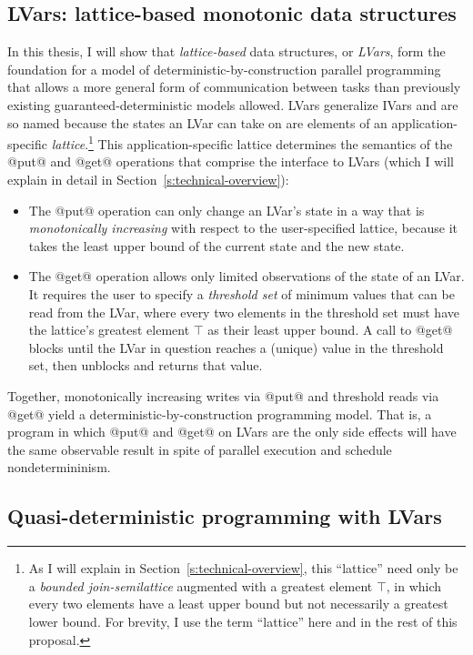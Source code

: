 \documentclass{article}
\begin{document}
\subsection{LVars: lattice-based monotonic data structures}

In this thesis, I will show that \emph{lattice-based} data structures,
or \emph{LVars}, form the foundation for a model of
deterministic-by-construction parallel programming that allows a more
general form of communication between tasks than previously existing
guaranteed-deterministic models allowed.  LVars generalize IVars and
are so named because the states an LVar can take on are elements of an
application-specific \emph{lattice}.\footnote{As I will explain in
  Section~\ref{s:technical-overview}, this ``lattice'' need only be a
  {\em bounded join-semilattice} augmented with a greatest element
  $\top$, in which every two elements have a least upper bound but not
  necessarily a greatest lower bound.  For brevity, I use the term
  ``lattice'' here and in the rest of this proposal.}  This
application-specific lattice determines the semantics of the @put@ and
@get@ operations that comprise the interface to LVars (which I will
explain in detail in Section~\ref{s:technical-overview}):
\begin{itemize}
\item The @put@ operation can only change an LVar's state in a way
  that is {\em monotonically increasing} with respect to the
  user-specified lattice, because it takes the least upper bound of
  the current state and the new state.
\item The @get@ operation allows only limited observations of the
  state of an LVar.  It requires the user to specify a \emph{threshold
    set} of minimum values that can be read from the LVar, where every
  two elements in the threshold set must have the lattice's greatest
  element $\top$ as their least upper bound.  A call to @get@ blocks
  until the LVar in question reaches a (unique) value in the threshold
  set, then unblocks and returns that value.
\end{itemize}
Together, monotonically increasing writes via @put@ and threshold
reads via @get@ yield a deterministic-by-construction programming
model.  That is, a program in which @put@ and @get@ on LVars are the
only side effects will have the same observable result in spite of
parallel execution and schedule nondetermininism.

\subsection{Quasi-deterministic programming with LVars}
\end{document}
